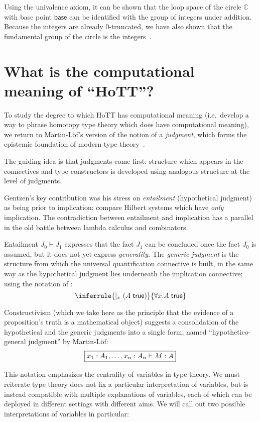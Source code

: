 \documentclass{article}
\newcommand\Circle{\mathbb{C}}
\newcommand\Base{\mathsf{base}}
\DeclarePairedDelimiter\Parens{\lparen}{\rparen}
\begin{document}
Using the univalence axiom, it can be shown that the loop space of the
circle $\Circle$ with base point $\Base$ can be identified with the
group of integers under addition. Because the integers are already
0-truncated, we have also shown that the fundamental group of the
circle is the integers~\citep{Licata:13}.


\section{What is the computational meaning of ``HoTT''?}

To study the degree to which HoTT has computational meaning (i.e.\
develop a way to phrase homotopy type theory which does have
computational meaning), we return to Martin-L\"of's version of the
notion of a \emph{judgment}, which forms the epistemic foundation of
modern type theory~\citep{MartinLof:87,MartinLof:94,MartinLof:96}.

The guiding idea is that judgments come first: structure which appears
in the connectives and type constructors is developed using analogous
structure at the level of judgments.

Gentzen's key contribution was his stress on \emph{entailment}
(hypothetical judgment) as being prior to implication; compare Hilbert
systems which have \emph{only} implication. The contradiction between
entailment and implication has a parallel in the old battle between
lambda calculus and combinators.

Entailment $J_0\vdash J_1$ expresses that the fact $J_1$ can be
concluded once the fact $J_0$ is assumed, but it does not yet express
\emph{generality}. The \emph{generic judgment} is the structure from
which the universal quantification connective is built, in the same
way as the hypothetical judgment lies underneath the implication
connective; using the notation of \citet{MartinLof:notes:87}:
\[
  \inferrule{
    \vert_x\ \Parens*{\trueF{A}}
  }{
    \trueF{\forall x.A}
  }
\]

Constructivism (which we take here as the principle that the evidence
of a proposition's truth is a mathematical object) suggests a
consolidation of the hypothetical and the generic judgments into a
single form, named ``hypothetico-general judgment'' by Martin-L\"of:
\[
  \framebox{$\hasEF{x_1:A_1,\ldots,x_n:A_n}{M}{A}$}
\]

This notation emphasizes the centrality of variables in type
theory. We must reiterate type theory does not fix a particular
interpretation of variables, but is instead compatible with multiple
explanations of variables, each of which can be deployed in different
settings with different aims. We will call out two possible
interpretations of variables in particular:
\end{document}
